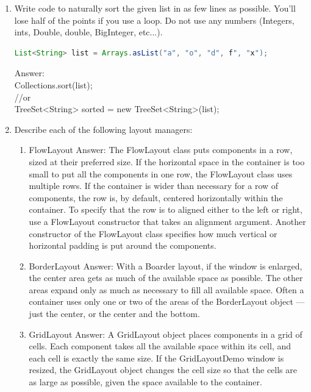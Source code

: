 \documentclass[11pt]{article}
\newenvironment{answer}{\large\lstset{basicstyle=\large\ttfamily}\color{white} \small{Answer:}}{}
\newenvironment{answer}{\large\lstset{basicstyle=\large\ttfamily}\color{red} \small{Answer:}}{}
\begin{document}
\begin{enumerate}
\item Write code to naturally sort the given list in as few lines as possible. You'll lose half
of the points if you use a loop. Do not use any numbers (Integers, ints, Double, double,
BigInteger, etc...).
\begin{lstlisting}[language=java]
List<String> list = Arrays.asList("a", "o", "d", f", "x");
\end{lstlisting}
\begin{answer}
\\Collections.sort(list);
\\//or
\\TreeSet<String> sorted = new TreeSet<String>(list);
\end{answer}



\item Describe each of the following layout managers:
\begin{enumerate}
\item FlowLayout
\begin{answer}
The FlowLayout class puts components in a row, sized at their preferred size. If the horizontal space in the container is too small to put all the components in one row, the FlowLayout class uses multiple rows. If the container is wider than necessary for a row of components, the row is, by default, centered horizontally within the container. To specify that the row is to aligned either to the left or right, use a FlowLayout constructor that takes an alignment argument. Another constructor of the FlowLayout class specifies how much vertical or horizontal padding is put around the components. \end{answer}
\item BorderLayout
\begin{answer}
With a Boarder layout, if the window is enlarged, the center area gets as much of the available space as possible. The other areas expand only as much as necessary to fill all available space. Often a container uses only one or two of the areas of the BorderLayout object — just the center, or the center and the bottom. \end{answer}
\item GridLayout
\begin{answer}
A GridLayout object places components in a grid of cells. Each component takes all the available space within its cell, and each cell is exactly the same size. If the GridLayoutDemo window is resized, the GridLayout object changes the cell size so that the cells are as large as possible, given the space available to the container.\end{answer}
\end{enumerate}





\end{enumerate}
\end{document}
